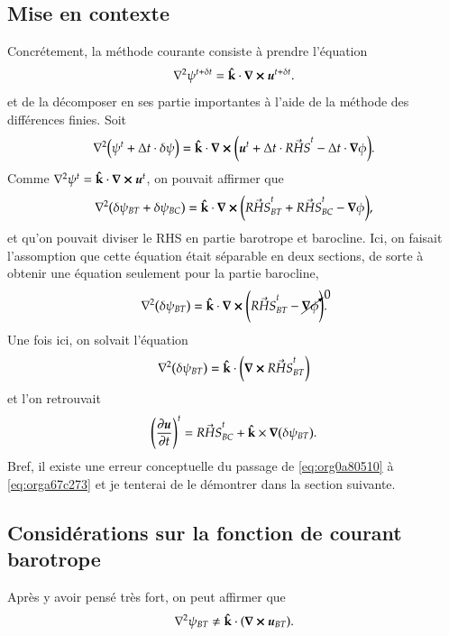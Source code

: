 \documentclass[10pt]{article}
\numberwithin{equation}{section}
\newcommand{\kvf}{\vb{\hat{k}}}
\newcommand{\uu}{\vb*{u}}
\begin{document}
\subsection{Mise en contexte}
\label{sec:org0755934}
Concrétement, la méthode courante consiste à prendre l'équation
\begin{equation}
   \laplacian{\psi^{t+\delta t}} = \kvf\cdot\curl{\uu^{t+\delta t}}.
\end{equation}
et de la décomposer en ses partie importantes à l'aide de la méthode des différences finies.
Soit
\begin{equation}
   \laplacian(\psi^t + \Delta t\cdot\delta \psi) = \kvf\cdot\curl(\uu^t + \Delta t\cdot\vec{RHS}^t - \Delta t\cdot\gradient{\phi}).
\end{equation}
Comme \(\laplacian{\psi^t} = \kvf\cdot\curl{\uu^t}\), on pouvait affirmer que
\begin{equation}
\label{eq:org0a80510}
   \laplacian(\delta \psi_{BT} + \delta \psi_{BC}) = \kvf\cdot\curl(\vec{RHS}^t_{BT} + \vec{RHS}^t_{BC} - \gradient{\phi}),
\end{equation}
et qu'on pouvait diviser le RHS en partie barotrope et barocline.
Ici, on faisait l'assomption que cette équation était séparable en deux sections, de sorte à obtenir une équation seulement pour la partie barocline,
\begin{equation}
\label{eq:orga67c273}
   \laplacian(\delta \psi_{BT}) = \kvf\cdot\curl(\vec{RHS}^t_{BT} - \cancelto{0}{\gradient{\phi}}).
\end{equation}
Une fois ici, on solvait l'équation
\begin{equation}
   \laplacian(\delta \psi_{BT}) = \kvf\cdot\qty(\curl{\vec{RHS}^t_{BT}})
\end{equation}
et l'on retrouvait
\begin{equation}
   \qty(\pdv{\uu}{t})^t = \vec{RHS}^t_{BC} + \kvf\times\gradient(\delta\psi_{BT}).
\end{equation}
Bref, il existe une erreur conceptuelle du passage de \ref{eq:org0a80510} à \ref{eq:orga67c273} et je tenterai de le démontrer dans la section suivante.


\subsection{Considérations sur la fonction de courant barotrope}
\label{sec:org6740a7a}
Après y avoir pensé très fort, on peut affirmer que
\begin{equation}
   \laplacian{\psi_{BT}} \not= \kvf\cdot\qty(\curl{\uu_{BT}}).
\end{equation}
\end{document}
